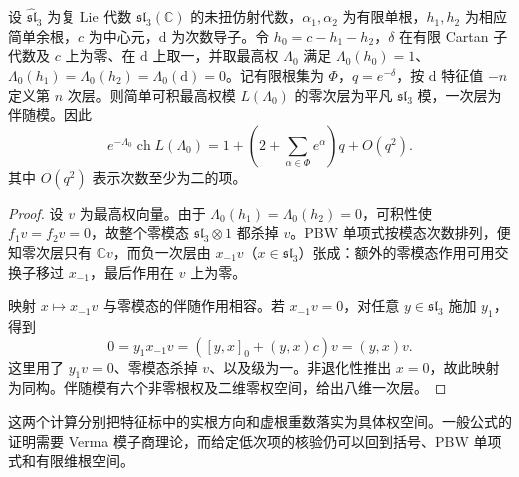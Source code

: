 \begin{proposition}\label{b5:prop:G-sl3-first-grade}
	设 \(\widehat{\mathfrak{sl}}_3\) 为复 Lie 代数 \(\mathfrak{sl}_3(\mathbb C)\) 的未扭仿射代数，\(\alpha_1,\alpha_2\) 为有限单根，\(h_1,h_2\) 为相应简单余根，\(c\) 为中心元，\(\mathrm d\) 为次数导子。令 \(h_0=c-h_1-h_2\)，\(\delta\) 在有限 Cartan 子代数及 \(c\) 上为零、在 \(\mathrm d\) 上取一，并取最高权 \(\Lambda_0\) 满足 \(\Lambda_0(h_0)=1\)、\(\Lambda_0(h_1)=\Lambda_0(h_2)=\Lambda_0(\mathrm d)=0\)。记有限根集为 \(\Phi\)，\(q=e^{-\delta}\)，按 \(\mathrm d\) 特征值 \(-n\) 定义第 \(n\) 次层。则简单可积最高权模 \(L(\Lambda_0)\) 的零次层为平凡 \(\mathfrak{sl}_3\) 模，一次层为伴随模。因此
	\[
		e^{-\Lambda_0}\operatorname{ch}L(\Lambda_0)
		=1+\left(2+\sum_{\alpha\in\Phi}e^\alpha\right)q+O(q^2).
	\]
	其中 \(O(q^2)\) 表示次数至少为二的项。
\end{proposition}
\begin{proof}
	设 \(v\) 为最高权向量。由于 \(\Lambda_0(h_1)=\Lambda_0(h_2)=0\)，可积性使 \(f_1v=f_2v=0\)，故整个零模态 \(\mathfrak{sl}_3\otimes1\) 都杀掉 \(v\)。PBW 单项式按模态次数排列，便知零次层只有 \(\mathbb Cv\)，而负一次层由 \(x_{-1}v\)（\(x\in\mathfrak{sl}_3\)）张成：额外的零模态作用可用交换子移过 \(x_{-1}\)，最后作用在 \(v\) 上为零。

	映射 \(x\mapsto x_{-1}v\) 与零模态的伴随作用相容。若 \(x_{-1}v=0\)，对任意 \(y\in\mathfrak{sl}_3\) 施加 \(y_1\)，得到
	\[
		0=y_1x_{-1}v=([y,x]_0+(y,x)c)v=(y,x)v.
	\]
	这里用了 \(y_1v=0\)、零模态杀掉 \(v\)、以及级为一。非退化性推出 \(x=0\)，故此映射为同构。伴随模有六个非零根权及二维零权空间，给出八维一次层。
\end{proof}

这两个计算分别把特征标中的实根方向和虚根重数落实为具体权空间。一般公式的证明需要 Verma 模子商理论，而给定低次项的核验仍可以回到括号、PBW 单项式和有限维根空间。

